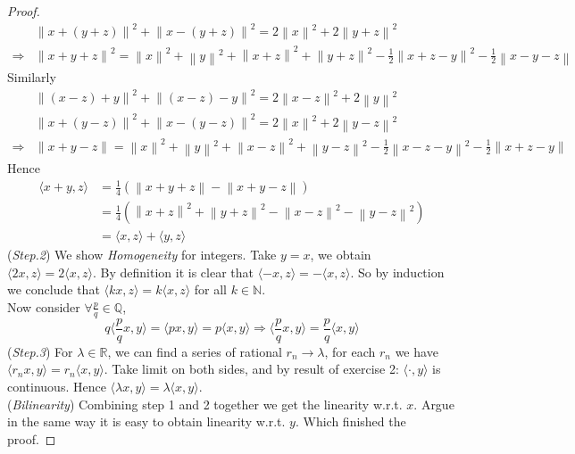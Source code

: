 \documentclass[a4paper, 10pt]{article}
\theoremstyle{definition}
\theoremstyle{hSol}
\begin{document}
\begin{proof}
\begin{equation}
\begin{split}
		& \left\|x+(y+z)\right\|^2 + \left\|x-(y+z)\right\|^2 = 2 \left\|x\right\|^2 + 2 \left\|y+z\right\|^2 \\
		\Rightarrow & \left\|x+y+z\right\|^2 = \left\|x\right\|^2 + \left\|y\right\|^2 + \left\|x+z\right\|^2 + \left\|y+z\right\|^2 - \frac{1}{2} \left\|x+z-y\right\|^2 - \frac{1}{2}\left\|x-y-z\right\|
	\end{split}
\end{equation}
Similarly
\begin{equation}
	\begin{split}
		& \left\|(x-z)+y\right\|^2 + \left\|(x-z)-y\right\|^2 = 2 \left\|x-z\right\|^2 + 2\left\|y\right\|^2\\
		& \left\|x+(y-z)\right\|^2 + \left\|x-(y-z)\right\|^2 = 2 \left\|x\right\|^2 + 2 \left\|y-z\right\|^2 \\
		\Rightarrow & \left\|x+y-z\right\| = \left\|x\right\|^2 + \left\|y\right\|^2 + \left\|x-z\right\|^2 + \left\|y-z\right\|^2 - \frac{1}{2} \left\|x-z-y\right\|^2 - \frac{1}{2}\left\|x+z-y\right\|
	\end{split}
\end{equation}
Hence
\begin{equation}
	\begin{split}
		\langle x+y,z \rangle &= \frac{1}{4}\left(\left\|x+y+z\right\|-\left\|x+y-z\right\|\right) \\
		& = \frac{1}{4}\left(\left\|x+z\right\|^2 + \left\|y+z\right\|^2 - \left\|x-z\right\|^2 - \left\|y-z\right\|^2\right) \\
		& = \langle x,z \rangle + \langle y,z \rangle
	\end{split}
\end{equation}
(\textit{Step.2}) We show \textit{Homogeneity} for integers. Take $y=x$, we obtain $\langle 2x, z \rangle = 2 \langle x,z \rangle$. By definition it is clear that $\langle -x,z \rangle=-\langle x,z \rangle$. So by induction we conclude that $\langle kx,z \rangle = k \langle x,z \rangle$ for all $k\in \mathbb{N}$. \\
Now consider $\forall \frac{p}{q}\in \mathbb{Q}$,
\begin{equation}
	q\langle \frac{p}{q}x,y \rangle = \langle px, y \rangle = p \langle x,y \rangle \Rightarrow \langle \frac{p}{q}x,y \rangle = \frac{p}{q} \langle x,y \rangle
\end{equation}
(\textit{Step.3}) For $\lambda \in \mathbb{R}$, we can find a series of rational $r_n \to \lambda$, for each $r_n$ we have $\langle r_n x, y \rangle=r_n \langle x,y \rangle$. Take limit on both sides, and by result of exercise 2: $\langle \cdot, y \rangle$ is continuous. Hence $\langle \lambda x, y \rangle = \lambda \langle x,y \rangle$. \\
(\textit{Bilinearity}) Combining step 1 and 2 together we get the linearity w.r.t. $x$. Argue in the same way it is easy to obtain linearity w.r.t. $y$. Which finished the proof.
\end{proof}
\end{document}
